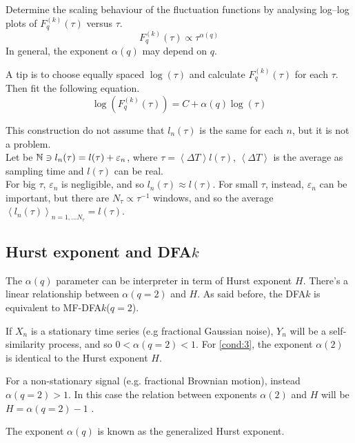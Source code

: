 \begin{step}\label{step5}
Determine the scaling behaviour of the fluctuation functions by analysing
log–log plots of $F_q^{( k )}(\tau )$ versus $\tau$.
\begin{equation}
	F_q^{( k )}(\tau ) \propto \tau^{\alpha(q)}
\end{equation}
In general, the exponent $\alpha(q)$ may depend on $q$. 

A tip is to choose equally spaced $\log(\tau)$ and calculate $F_q^{( k )}(\tau )$ for each $\tau$. Then fit the following equation.
\begin{equation}
	\log(F_q^{( k )}(\tau )) = C + \alpha(q) \log(\tau)
\end{equation}

This construction do not assume that $l_n(\tau)$ is the same for each $n$, but it is not a problem. \\
Let be $\mathbb{N} \ni l_n(\tau) = l(\tau) + \varepsilon_n$, where $\tau = \left< \Delta T\right> l(\tau)$, $\left< \Delta T\right>$ is the average as sampling time and $l(\tau)$ can be real. \\
For big $\tau$, $\varepsilon_n$ is negligible, and so $l_n(\tau) \approx l(\tau)$. For small $\tau$, instead, $\varepsilon_n$ can be important, but there are $N_{\tau} \propto \tau^{-1}$ windows, and so the average $\left< l_n(\tau) \right>_{n = 1, \dots N_{\tau}} = l(\tau)$.
\end{step}

\subsection{Hurst exponent and DFA$k$}\label{sec:hdfa}
The $\alpha(q)$ parameter can be interpreter in term of Hurst exponent $H$. There's a linear relationship between $\alpha(q=2)$ and $H$. As said before, the DFA$k$ is equivalent to MF-DFA$k$($q=2$).

If $X_n$ is a stationary time series (e.g fractional Gaussian noise), $Y_n$ will be a self-similarity process, and so $0 < \alpha(q = 2) < 1$. For \autoref{cond:3}, the exponent $\alpha(2)$ is identical to the Hurst exponent $H$.

For a non-stationary signal (e.g. fractional Brownian motion), instead $\alpha(q = 2) > 1$. In this case the relation between exponents $\alpha(2)$ and $H$ will be $H = \alpha(q = 2)-1$ \cite{Movahed_2006}.  

The exponent $\alpha(q)$ is known as the generalized Hurst exponent.